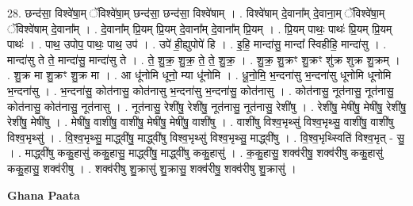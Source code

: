 \documentclass[17pt]{extarticle}
\begin{document}
28. छन्द॑सा॒ विश्वे॑षा॒म् ॅविश्वे॑षा॒म् छन्द॑सा॒ छन्द॑सा॒ विश्वे॑षाम् । . विश्वे॑षाम् दे॒वाना᳚म् दे॒वाना॒म् ॅविश्वे॑षा॒म् ॅविश्वे॑षाम् दे॒वाना᳚म् । . दे॒वाना᳚म् प्रि॒यम् प्रि॒यम् दे॒वाना᳚म् दे॒वाना᳚म् प्रि॒यम् । . प्रि॒यम् पाथः॒ पाथः॑ प्रि॒यम् प्रि॒यम् पाथः॑ । . पाथ॒ उपोप॒ पाथः॒ पाथ॒ उप॑ । . उपे॑ ही॒ह्युपोपे॑ हि । . इ॒हि॒ मान्दा॑सु॒ मान्दा᳚ स्विहीहि॒ मान्दा॑सु । . मान्दा॑सु ते ते॒ मान्दा॑सु॒ मान्दा॑सु ते । . ते॒ शु॒क्र॒ शु॒क्र॒ ते॒ ते॒ शु॒क्र॒ । . शु॒क्र॒ शु॒क्रꣳ शु॒क्रꣳ शु॑क्र शुक्र शु॒क्रम् । . शु॒क्र मा शु॒क्रꣳ शु॒क्र मा । . आ धू॑नोमि धूनो॒ म्या धू॑नोमि । . धू॒नो॒मि॒ भ॒न्दना॑सु भ॒न्दना॑सु धूनोमि धूनोमि भ॒न्दना॑सु । . भ॒न्दना॑सु॒ कोत॑नासु॒ कोत॑नासु भ॒न्दना॑सु भ॒न्दना॑सु॒ कोत॑नासु । . कोत॑नासु॒ नूत॑नासु॒ नूत॑नासु॒ कोत॑नासु॒ कोत॑नासु॒ नूत॑नासु । . नूत॑नासु॒ रेशी॑षु॒ रेशी॑षु॒ नूत॑नासु॒ नूत॑नासु॒ रेशी॑षु । . रेशी॑षु॒ मेषी॑षु॒ मेषी॑षु॒ रेशी॑षु॒ रेशी॑षु॒ मेषी॑षु । . मेषी॑षु॒ वाशी॑षु॒ वाशी॑षु॒ मेषी॑षु॒ मेषी॑षु॒ वाशी॑षु । . वाशी॑षु विश्व॒भृथ्सु॑ विश्व॒भृथ्सु॒ वाशी॑षु॒ वाशी॑षु विश्व॒भृथ्सु॑ । . वि॒श्व॒भृथ्सु॒ माद्ध्वी॑षु॒ माद्ध्वी॑षु विश्व॒भृथ्सु॑ विश्व॒भृथ्सु॒ माद्ध्वी॑षु । . वि॒श्व॒भृथ्स्विति॑ विश्व॒भृत् - सु॒ । . माद्ध्वी॑षु ककु॒हासु॑ ककु॒हासु॒ माद्ध्वी॑षु॒ माद्ध्वी॑षु ककु॒हासु॑ । . क॒कु॒हासु॒ शक्व॑रीषु॒ शक्व॑रीषु ककु॒हासु॑ ककु॒हासु॒ शक्व॑रीषु । . शक्व॑रीषु शु॒क्रासु॑ शु॒क्रासु॒ शक्व॑रीषु॒ शक्व॑रीषु शु॒क्रासु॑ । \newline

\textbf{Ghana Paata } \newline
\end{document}
